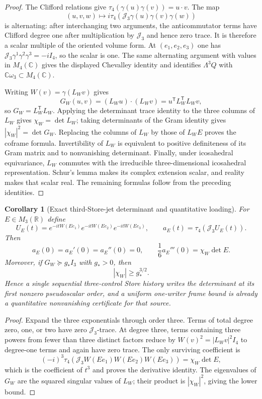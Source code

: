 \documentclass[11pt]{article}
\newtheorem{corollary}[theorem]{Corollary}
\theoremstyle{definition}
\theoremstyle{remark}
\newcommand{\R}{\mathbb R}
\newcommand{\C}{\mathbb C}
\begin{document}
\begin{proof}
The Clifford relations give
$\tau_4(\gamma(u)\gamma(v))=u\cdot v$.  The map
\[
 (u,v,w)\longmapsto
 i\tau_4(\mathcal J_3\gamma(u)\gamma(v)\gamma(w))
\]
is alternating: after interchanging two arguments, the anticommutator terms
have Clifford degree one after multiplication by $\mathcal J_3$ and hence zero
trace.  It is therefore a scalar multiple of the oriented volume form.  At
$(e_1,e_2,e_3)$ one has
$\mathcal J_3\gamma^1\gamma^2\gamma^3=-iI_4$, so the scalar is one.  The same
alternating argument with values in $M_4(\C)$ gives the displayed Chevalley
identity and identifies $\Lambda^3Q$ with $\C\omega_3\subset M_4(\C)$.

Writing $W(v)=\gamma(L_Wv)$ gives
\[
 G_W(u,v)=(L_Wu)\cdot(L_Wv)
 =u^{\mathsf T}L_W^{\mathsf T}L_Wv,
\]
so $G_W=L_W^{\mathsf T}L_W$.  Applying the determinant trace identity to the
three columns of $L_W$ gives $\chi_W=\det L_W$; taking determinants of the Gram
identity gives $|\chi_W|^2=\det G_W$.  Replacing the columns of $L_W$ by those
of $L_WE$ proves the coframe formula.  Invertibility of $L_W$ is equivalent to
positive definiteness of its Gram matrix and to nonvanishing determinant.
Finally, under icosahedral equivariance, $L_W$ commutes with the irreducible
three-dimensional icosahedral representation.  Schur's lemma makes its complex
extension scalar, and reality makes that scalar real.  The remaining formulas
follow from the preceding identities.
\end{proof}

\begin{corollary}[Exact third-Store-jet determinant and quantitative loading]
\label{cor:single-writer-third-jet-master}
For $E\in M_3(\R)$ define
\[
 U_E(t)=
 e^{-itW(Ee_1)}e^{-itW(Ee_2)}e^{-itW(Ee_3)},
 \qquad
 a_E(t)=\tau_4(\mathcal J_3U_E(t)).
\]
Then
\[
 a_E(0)=a_E'(0)=a_E''(0)=0,
 \qquad
 \boxed{\frac1{6}a_E'''(0)=\chi_W\det E.}
\]
Moreover, if $G_W\succeq g_*I_3$ with $g_*>0$, then
\[
 \boxed{|\chi_W|\ge g_*^{3/2}.}
\]
Hence a single sequential three-control Store history writes the determinant
at its first nonzero pseudoscalar order, and a uniform one-writer frame bound
is already a quantitative nonvanishing certificate for that source.
\end{corollary}

\begin{proof}
Expand the three exponentials through order three.  Terms of total degree zero,
one, or two have zero $\mathcal J_3$-trace.  At degree three, terms containing
three powers from fewer than three distinct factors reduce by
$W(v)^2=|L_Wv|^2I_4$ to degree-one terms and again have zero trace.  The only
surviving coefficient is
\[
 (-i)^3\tau_4\!\left(
 \mathcal J_3W(Ee_1)W(Ee_2)W(Ee_3)\right)
 =\chi_W\det E,
\]
which is the coefficient of $t^3$ and proves the derivative identity.  The
eigenvalues of $G_W$ are the squared singular values of $L_W$; their product is
$|\chi_W|^2$, giving the lower bound.
\end{proof}
\end{document}
